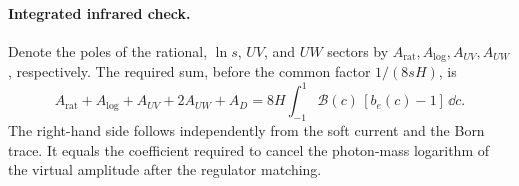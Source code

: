 \paragraph{Integrated infrared check.} Denote the poles of the
rational, $\ln s$, $UV$, and $UW$ sectors by
$A_{\mathrm{rat}},A_{\log},A_{UV},A_{UW}$, respectively.
The required sum, before the common factor $1/(8sH)$, is
\begin{equation}
 A_{\mathrm{rat}}+A_{\log}+A_{UV}+2A_{UW}+A_D
 =8H\int_{-1}^1\mathcal B(c)\,[b_e(c)-1]\,\dd c.
 \label{eq:comp-real-integrated-pole-check}
\end{equation}
The right-hand side follows independently from the soft current
and the Born trace. It equals the coefficient required to cancel
the photon-mass logarithm of the virtual amplitude after the
regulator matching.
